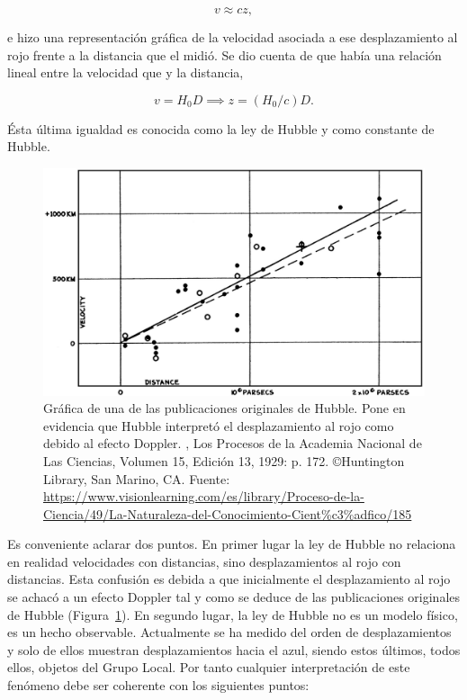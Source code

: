 \begin{equation}
    v\approx c z,
\end{equation}

e hizo una representación gráfica de la velocidad asociada a ese desplazamiento al rojo frente a la distancia que el midió. Se dio cuenta de que había una relación lineal entre la velocidad que y la distancia,

\begin{equation}
    v={H}_{0}D \implies z= ({H}_{0}/c)D.
\end{equation}

Ésta última igualdad es conocida como la ley de Hubble y  como constante de Hubble.

\begin{figure}[htb]
    \begin{center}
         \includegraphics[width=13cm]{1_Introduccion/hubble.jpg}
    \end{center}
    
    \caption{\small Gráfica de una de las publicaciones originales de Hubble. Pone en evidencia que Hubble interpretó el desplazamiento al rojo como debido al efecto Doppler. , Los Procesos de la Academia Nacional de Las Ciencias, Volumen 15, Edición 13, 1929: p. 172. ©Huntington Library, San Marino, CA. Fuente: \url{https://www.visionlearning.com/es/library/Proceso-de-la-Ciencia/49/La-Naturaleza-del-Conocimiento-Cient\%c3\%adfico/185}}
    \label{fig:publicacion_hubble}
\end{figure}

Es conveniente aclarar dos puntos. En primer lugar la ley de Hubble no relaciona en realidad velocidades con distancias, sino desplazamientos al rojo con distancias. Esta confusión es debida a que inicialmente el desplazamiento al rojo se achacó a un efecto Doppler tal y como se deduce de las publicaciones originales de Hubble (Figura~\ref{fig:publicacion_hubble}). En segundo lugar, la ley de Hubble no es un modelo físico, es un hecho observable. Actualmente se ha medido del orden de  desplazamientos y solo  de ellos muestran desplazamientos hacia el azul, siendo estos últimos, todos ellos, objetos del Grupo Local.
Por tanto cualquier interpretación de este fenómeno debe ser coherente con los siguientes puntos:

